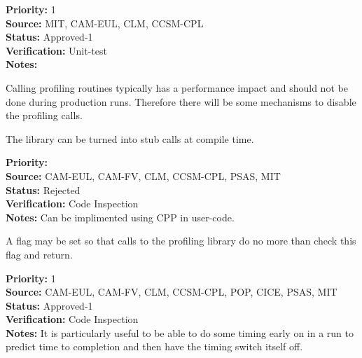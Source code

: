 \begin{reqlist}
{\bf Priority:} 1 \\
{\bf Source:}  MIT, CAM-EUL, CLM, CCSM-CPL \\
{\bf Status:} Approved-1 \\
{\bf Verification:} Unit-test \\
{\bf Notes:} 
\end{reqlist}


Calling profiling routines typically has a performance impact and should not
be done during production runs.  Therefore there will be some mechanisms to 
disable the profiling calls.


The library can be turned into stub calls at compile time.

\begin{reqlist}
{\bf Priority:}  \\
{\bf Source:} CAM-EUL, CAM-FV, CLM, CCSM-CPL, PSAS, MIT \\
{\bf Status:} Rejected \\
{\bf Verification:} Code Inspection \\
{\bf Notes:} Can be implimented using CPP in user-code.
\end{reqlist}


A flag may be set so that calls to the profiling library do no more than check
this flag and return.

\begin{reqlist}
{\bf Priority:} 1 \\
{\bf Source:} CAM-EUL, CAM-FV, CLM, CCSM-CPL, POP, CICE, PSAS, MIT \\
{\bf Status:} Approved-1 \\
{\bf Verification:} Code Inspection \\
{\bf Notes:} It is particularly useful to be able to do some timing
early on in a run to predict time to completion and then have
the timing switch itself off.
\end{reqlist}

